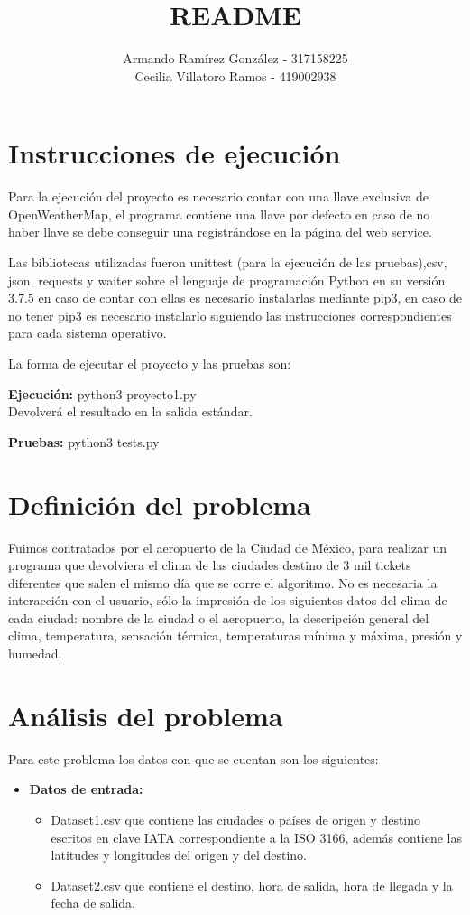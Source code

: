 \documentclass[]{article}
\title{README}
\author{Armando Ramírez González - 317158225 \\ Cecilia Villatoro Ramos - 419002938}
\begin{document}
\maketitle

\section{Instrucciones de ejecución}
Para la ejecución del proyecto es necesario contar con una llave exclusiva de OpenWeatherMap, el programa contiene una llave por defecto en caso de no haber llave se debe conseguir una registrándose en la página del web service.

Las bibliotecas utilizadas fueron unittest (para la ejecución de las pruebas),csv, json, requests y waiter sobre el lenguaje de programación Python en su versión $ 3.7.5 $ en caso de contar con ellas es necesario instalarlas mediante pip3, en caso de no tener pip3 es necesario instalarlo siguiendo las instrucciones correspondientes para cada sistema operativo.

La forma de ejecutar el proyecto y las pruebas son:
\begin{center}
	\textbf{Ejecución:} python3 proyecto1.py \\
	Devolverá el resultado en la salida estándar.\\
\end{center}
\begin{center}
	\textbf{Pruebas:} python3 tests.py
\end{center}

\section{Definición del problema}
Fuimos contratados por el aeropuerto de la Ciudad de México, para realizar un programa que devolviera el clima de las ciudades destino de 3 mil tickets diferentes que salen el mismo día que se corre el algoritmo. No es necesaria la interacción con el usuario, sólo la impresión de los siguientes datos del clima de cada ciudad: nombre de la ciudad o el aeropuerto, la descripción general del clima, temperatura, sensación térmica, temperaturas mínima y máxima, presión y humedad.


\section{Análisis del problema}
Para este problema los datos con que se cuentan son los siguientes:
\begin{itemize}
	\item \textbf{Datos de entrada:}
	\begin{itemize}
		\item Dataset1.csv que contiene las ciudades o países de origen y destino escritos en clave IATA correspondiente a la ISO 3166, además contiene las latitudes y longitudes del origen y del destino.		
		\item Dataset2.csv que contiene el destino, hora de salida, hora de llegada y la fecha de salida.
	\end{itemize}
\end{itemize}
\end{document}
